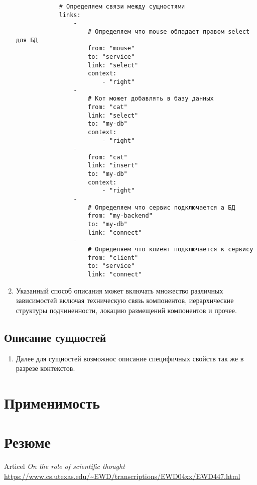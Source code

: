 \documentclass[final]{article}
\begin{document}
\begin{enumerate}
\begin{verbatim}
            # Определяем связи между сущностями
            links:         
                - 
                    # Определяем что mouse обладает правом select для БД
                    from: "mouse" 
                    to: "service"
                    link: "select"
                    context: 
                        - "right"
                -              
                    # Кот может добавлять в базу данных
                    from: "cat"
                    link: "select"
                    to: "my-db"
                    context: 
                        - "right"
                -              
                    from: "cat"
                    link: "insert"
                    to: "my-db"
                    context: 
                        - "right"
                -
                    # Определяем что сервис подключается а БД
                    from: "my-backend"
                    to: "my-db"
                    link: "connect"
                -
                    # Определяем что клиент подключается к сервису
                    from: "client"
                    to: "service"
                    link: "connect"

            \end{verbatim}

            \item Указанный способ описания может включать множество различных 
            зависимостей включая техническую связь компонентов, иерархические 
            структуры подчиненности, локацию размещений компонентов и прочее.
 
        \end{enumerate}



    \subsection{Описание сущностей}
        \begin{enumerate}

            \item Далее для сущностей возможнос описание специфичных свойств
            так же в разрезе контекстов.


        \end{enumerate}
        


    \section{Применимость}
        

    \section{Резюме}

    \renewcommand{\refname}{Список литературы}
    \begin{thebibliography}{9}

         Articel
        \textit{On the role of scientific thought}
        \url{https://www.cs.utexas.edu/~EWD/transcriptions/EWD04xx/EWD447.html}



    \end{thebibliography}
\end{document}
